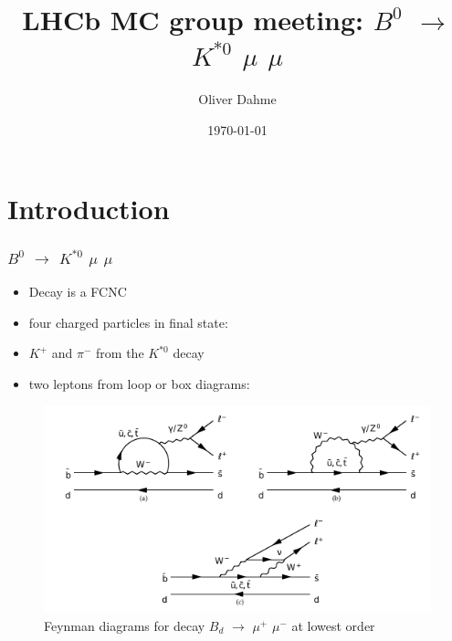 \documentclass{beamer}
\title[$B^0$ $\rightarrow$ $K^{*0}$ $\mu$ $\mu$]{LHCb MC group meeting: $B^0$ $\rightarrow$ $K^{*0}$ $\mu$ $\mu$} %
\author{Oliver Dahme} %
\institute[UZH] %
{
University of Zurich \\ %
\medskip
\textit{o.dahme@cern.ch} %
}
\date{\today} %
\begin{document}
\begin{frame}
\titlepage %
\end{frame}




\section{Introduction} %

\begin{frame}
\frametitle{$B^0$ $\rightarrow$ $K^{*0}$ $\mu$ $\mu$}

\begin{itemize}
  \item Decay is a FCNC
  \item four charged particles in final state:
  \item $K^+$ and $\pi^-$ from the $K^{*0}$ decay
  \item two leptons from loop or box diagrams:
\end{itemize}


\begin{figure}
\includegraphics[width=0.8\linewidth]{KstarFeynman}
\caption{Feynman diagrams for decay $B_d$ $\rightarrow$ $\mu^+$ $\mu^-$ at lowest order}
\end{figure}
\end{frame}
\end{document}
